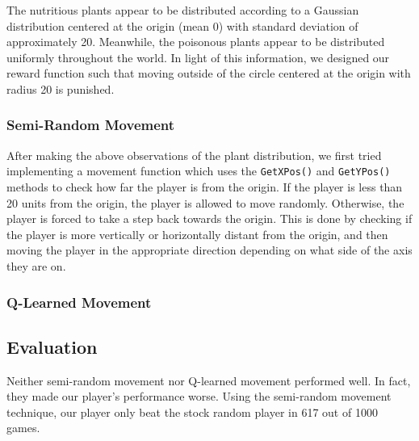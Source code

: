 \documentclass[solution, letterpaper]{cs121}
\begin{document}
The nutritious plants appear to be distributed according to a Gaussian distribution centered at the origin (mean 0) with standard deviation of approximately 20. Meanwhile, the poisonous plants appear to be distributed uniformly throughout the world. In light of this information, we designed our reward function such that moving outside of the circle centered at the origin with radius 20 is punished.

\subsubsection{Semi-Random Movement}
After making the above observations of the plant distribution, we first tried implementing a movement function which uses the {\tt GetXPos()} and {\tt GetYPos()} methods to check how far the player is from the origin. If the player is less than 20 units from the origin, the player is allowed to move randomly. Otherwise, the player is forced to take a step back towards the origin. This is done by checking if the player is more vertically or horizontally distant from the origin, and then moving the player in the appropriate direction depending on what side of the axis they are on.

\subsubsection{Q-Learned Movement}

\subsection{Evaluation}
Neither semi-random movement nor Q-learned movement performed well. In fact, they made our player's performance worse. Using the semi-random movement technique, our player only beat the stock random player in 617 out of 1000 games.
\end{document}
